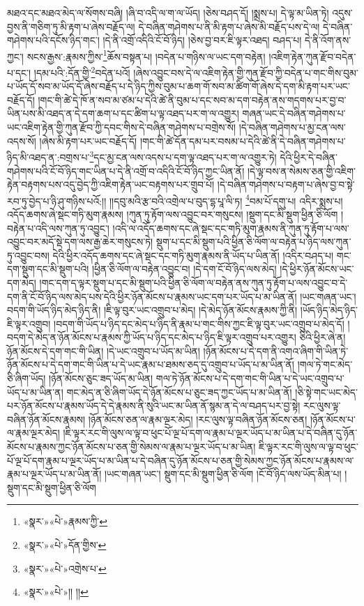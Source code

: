 མཐའ་དང་མཐའ་མེད་ལ་སོགས་བཞི། །ཞི་བ་འདི་ལ་ག་ལ་ཡོད། །ཅེས་བཤད་དོ། །སྨྲས་པ། དེ་ལྟ་མ་ཡིན་ཏེ། འདུས་བྱས་ནི་གཅིག་ཏུ་མི་རྟག་པ་ཞེས་བརྗོད་ལ། དེ་བཞིན་གཤེགས་པ་ནི་མི་རྟག་པ་ཞེས་མི་བརྗོད་པས་དེ་ལ། དེ་བཞིན་གཤེགས་པའི་དངོས་ཉིད་གང་། །དེ་ནི་འགྲོ་འདིའི་ངོ་བོ་ཉིད། །ཅེས་བྱ་བར་ཇི་ལྟར་འཐད། བཤད་པ། དེ་ནི་འོག་ནས་ཀྱང་། སངས་རྒྱས་:རྣམས་ཀྱིས་\footnote{«སྣར་»«པེ་»རྣམས་ཀྱི་}ཆོས་བསྟན་པ། །བདེན་པ་གཉིས་ལ་ཡང་དག་བརྟེན། །འཇིག་རྟེན་ཀུན་རྫོབ་བདེན་པ་དང་། །དམ་པའི་:དོན་གྱི་\footnote{«སྣར་»«པེ་»དོན་གྱིས་}བདེན་པའོ། །ཞེས་འབྱུང་བས་དེ་ལ་འཇིག་རྟེན་གྱི་ཀུན་རྫོབ་ཀྱི་བདེན་པ་གང་གིས་བུམ་པ་ཡོད་དོ་སབ་མ་ཡོད་དོ་ཞེས་བརྗོད་པ་དེ་ཉིད་ཀྱིས་བུམ་པ་ཆག་གོ་སབ་མ་ཚིག་གོ་ཞེས་དེ་དག་མི་རྟག་པར་ཡང་བརྗོད་དོ། །གང་གི་ཚེ་དེ་ཁོ་ན་སབ་མ་ཙམ་པ་དེའི་ཚེ་ནི་བུམ་པ་དང་སབ་མ་དག་བརྟེན་ནས་གདགས་པར་བྱ་བ་ཡིན་པས་མི་འཐད་ན་དེ་དག་ཆག་པ་དང་ཚིག་པ་ལྟ་འཐད་པར་ག་ལ་འགྱུར། གཞན་ཡང་དེ་བཞིན་གཤེགས་པ་ཡང་འཇིག་རྟེན་གྱི་ཀུན་རྫོབ་ཀྱི་དབང་གིས་དེ་བཞིན་གཤེགས་པ་བགྲེས་སོ། །དེ་བཞིན་གཤེགས་པ་མྱ་ངན་ལས་འདས་སོ། །ཞེས་མི་རྟག་པར་ཡང་བརྗོད་དོ། །གང་གི་ཚེ་དོན་དམ་པར་བསམ་པ་དེའི་ཚེ་ནི་དེ་བཞིན་གཤེགས་པ་ཉིད་མི་འཐད་ན་:བགྲས་པ་\footnote{«སྣར་»«པེ་»འགྲེས་པ་}དང་མྱ་ངན་ལས་འདས་པ་དག་ལྟ་འཐད་པར་ག་ལ་འགྱུར་ཏེ། དེའི་ཕྱིར་དེ་བཞིན་གཤེགས་པའི་ངོ་བོ་ཉིད་གང་ཡིན་པ་དེ་ནི་འགྲོ་བ་འདིའི་ངོ་བོ་ཉིད་ཀྱང་ཡིན་ནོ། །དེ་ལྟ་བས་ན་སེམས་ཅན་གྱི་འཇིག་རྟེན་བརྟགས་པས་འདུ་བྱེད་ཀྱི་འཇིག་རྟེན་ཡང་བརྟགས་པར་གྲུབ་པོ། །དེ་བཞིན་གཤེགས་པ་བརྟག་པ་ཞེས་བྱ་བ་སྟེ་རབ་ཏུ་བྱེད་པ་ཉི་ཤུ་གཉིས་པའོ:།། །།དབུ་མའི་རྩ་བའི་འགྲེལ་པ་བུད་དྷ་པཱ་ལི་ཏ། \footnote{«སྣར་»«པེ་»།། །། }བམ་པོ་དགུ་པ། འདིར་སྨྲས་པ། འདོད་ཆགས་ཞེ་སྡང་གཏི་མུག་རྣམས། །ཀུན་ཏུ་རྟོག་ལས་འབྱུང་བར་གསུངས། །སྡུག་དང་མི་སྡུག་ཕྱིན་ཅི་ལོག །བརྟེན་པ་འདི་ལས་ཀུན་ཏུ་འབྱུང་། །འདི་ལ་འདོད་ཆགས་དང་ཞེ་སྡང་དང་གཏི་མུག་རྣམས་ནི་ཀུན་ཏུ་རྟོག་པ་ལས་འབྱུང་བར་མདོ་སྡེ་དག་ལས་རྒྱ་ཆེར་གསུངས་ཏེ། སྡུག་པ་དང་མི་སྡུག་པའི་ཕྱིན་ཅི་ལོག་ལ་བརྟེན་པ་ཉིད་ལས་ཀུན་ཏུ་འབྱུང་བས། དེའི་ཕྱིར་འདོད་ཆགས་དང་ཞེ་སྡང་དང་གཏི་མུག་རྣམས་ནི་ཡོད་པ་ཡིན་ནོ། །འདིར་བཤད་པ། གང་དག་སྡུག་དང་མི་སྡུག་པའི། །ཕྱིན་ཅི་ལོག་ལ་བརྟེན་འབྱུང་བ། །དེ་དག་ངོ་བོ་ཉིད་ལས་མེད། །དེ་ཕྱིར་ཉོན་མོངས་ཡང་དག་མེད། །གང་དག་ད་ལྟར་སྡུག་པ་དང་མི་སྡུག་པའི་ཕྱིན་ཅི་ལོག་ལ་བརྟེན་ནས་ཀུན་ཏུ་རྟོག་པ་ལས་འབྱུང་བ་དེ་དག་ནི་ངོ་བོ་ཉིད་ལས་མེད་པས་དེའི་ཕྱིར་ཉོན་མོངས་པ་རྣམས་ཡང་དག་པར་ཡོད་པ་མ་ཡིན་ནོ། །ཡང་གཞན་ཡང་། བདག་གི་ཡོད་ཉིད་མེད་ཉིད་ནི། །ཇི་ལྟ་བུར་ཡང་འགྲུབ་པ་མེད། །དེ་མེད་ཉོན་མོངས་རྣམས་ཀྱི་ནི། །ཡོད་ཉིད་མེད་ཉིད་ཇི་ལྟར་འགྲུབ། །བདག་གི་ཡོད་པ་ཉིད་དང་མེད་པ་ཉིད་ནི་རྣམ་པ་གང་གིས་ཀྱང་ཇི་ལྟ་བུར་ཡང་འགྲུབ་པ་མེད་དོ། །བདག་དེ་མེད་ན་ཉོན་མོངས་པ་རྣམས་ཀྱི་ཡོད་པ་ཉིད་དང་མེད་པ་ཉིད་ཇི་ལྟར་འགྲུབ་པར་འགྱུར། ཅིའི་ཕྱིར་ཞེ་ན། ཉོན་མོངས་དེ་དག་གང་གི་ཡིན། །དེ་ཡང་འགྲུབ་པ་ཡོད་མ་ཡིན། །ཉོན་མོངས་པ་དེ་དག་ནི་འགའ་ཞིག་གི་ཡིན་ཏེ་ཉོན་མོངས་པ་དེ་དག་གང་གི་ཡིན་པ་དེ་ཡང་རྣམ་པ་ཐམས་ཅད་དུ་འགྲུབ་པ་ཡོད་པ་མ་ཡིན་ནོ། །གལ་ཏེ་གང་མེད་ཅི་ཞིག་ཡོད། །ཉོན་མོངས་ཅུང་ཟད་ཡོད་མ་ཡིན། གལ་ཏེ་ཉོན་མོངས་པ་དེ་དག་གང་གི་ཡིན་པ་དེ་ཡང་འགྲུབ་པ་ཡོད་པ་མ་ཡིན་ན། གང་མེད་ན་ཅི་ཞིག་ཡོད་དེ་ཉོན་མོངས་པ་ཅུང་ཟད་ཀྱང་ཡོད་པ་མ་ཡིན་ནོ། །ཅི་སྟེ་གང་ཡང་མེད་པར་ཉོན་མོངས་པ་རྣམས་ཡོད་དེ་དེ་རྣམས་ནི་སུའི་ཡང་མ་ཡིན་ནོ་སྙམ་ན་དེ་ལ་བཤད་པར་བྱ་སྟེ། རང་ལུས་ལྟ་བཞིན་ཉོན་མོངས་རྣམས། །ཉོན་མོངས་ཅན་ལ་རྣམ་ལྔར་མེད། །རང་ལུས་ལྟ་བཞིན་ཉོན་མོངས་ཅན། །ཉོན་མོངས་པ་ལ་རྣམ་ལྔར་མེད། །ཇི་ལྟར་རང་གི་ལུས་ལ་ལྟ་བ་ཕུང་པོ་ལྔ་པོ་དག་ལ་རྣམ་པ་ལྔར་ཡོད་པ་མ་ཡིན་པ་དེ་བཞིན་དུ་ཉོན་མོངས་པ་རྣམས་ཀྱང་ཉོན་མོངས་པ་ཅན་གྱི་སེམས་ལ་རྣམ་པ་ལྔར་ཡོད་པ་མ་ཡིན། ཇི་ལྟར་རང་གི་ལུས་ལ་ལྟ་བ་ཕུང་པོ་ལྔ་པོ་དག་རྣམ་པ་ལྔར་ཡོད་པ་མ་ཡིན་པ་དེ་བཞིན་དུ་ཉོན་མོངས་པ་ཅན་གྱི་སེམས་ཀྱང་ཉོན་མོངས་པ་རྣམས་ལ་རྣམ་པ་ལྔར་ཡོད་པ་མ་ཡིན་ནོ། །ཡང་གཞན་ཡང་། སྡུག་དང་མི་སྡུག་ཕྱིན་ཅི་ལོག །ངོ་བོ་ཉིད་ལས་ཡོད་མིན་པ། །སྡུག་དང་མི་སྡུག་ཕྱིན་ཅི་ལོག 